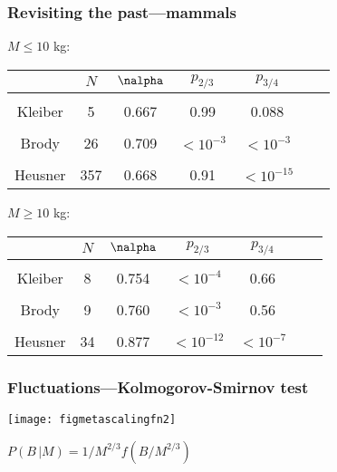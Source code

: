 \begin{frame}
  \frametitle{Revisiting the past---mammals}

  $M \leq 10$ kg:
   \begin{tabular}{ccccccc}
              & $N$ & $\nalpha$ & $p_{2/3}$ & $p_{3/4}$ \\ \hline
              & & & & & & \\
      Kleiber        &   5 & 0.667 &  0.99 & 0.088 \\
              & & & & & & \\
      Brody          &  26 & 0.709   & $<10^{-3}$ & $<10^{-3}$ \\
              & & & & & & \\
      Heusner        & 357 & 0.668 &   0.91 &   $<10^{-15}$ \\
    \end{tabular}



  $M \geq 10$ kg:
   \begin{tabular}{ccccccc}
              & $N$ & $\nalpha$ &  $p_{2/3}$ & $p_{3/4}$ \\ \hline
              & & & & & & \\
      Kleiber        &   8 & 0.754 & $<10^{-4}$ & 0.66 \\
              & & & & & & \\
      Brody          &   9 & 0.760 & $<10^{-3}$ & 0.56 \\
              & & & & & & \\
      Heusner        &  34 & 0.877 & $< 10^{-12}$ & $<10^{-7}$ \\
    \end{tabular}







\end{frame}

\begin{frame}
  \frametitle{\small Fluctuations---Kolmogorov-Smirnov test}

  \begin{center}
    \texttt{[image: figmetascalingfn2]}

     $  P(B\, |M) = 1/M^{2/3} f(B/M^{2/3})$
  \end{center}

\end{frame}

